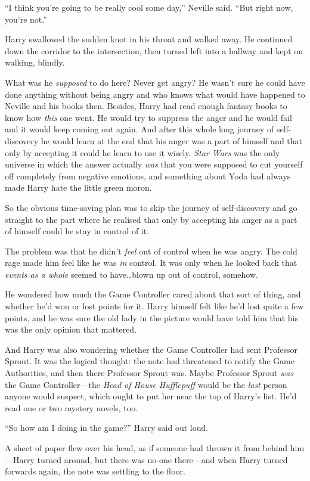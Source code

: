 “I think you’re going to be really cool some day,” Neville said. “But right now, you’re not.”

Harry swallowed the sudden knot in his throat and walked away. He continued down the corridor to the intersection, then turned left into a hallway and kept on walking, blindly.

What was he \emph{supposed} to do here? Never get angry? He wasn’t sure he could have done anything without being angry and who knows what would have happened to Neville and his books then. Besides, Harry had read enough fantasy books to know how \emph{this} one went. He would try to suppress the anger and he would fail and it would keep coming out again. And after this whole long journey of self-discovery he would learn at the end that his anger was a part of himself and that only by accepting it could he learn to use it wisely. \emph{Star Wars} was the only universe in which the answer actually \emph{was} that you were supposed to cut yourself off completely from negative emotions, and something about Yoda had always made Harry hate the little green moron.

So the obvious time-saving plan was to skip the journey of self-discovery and go straight to the part where he realised that only by accepting his anger as a part of himself could he stay in control of it.

The problem was that he didn’t \emph{feel} out of control when he was angry. The cold rage made him feel like he was \emph{in} control. It was only when he looked back that \emph{events as a whole} seemed to have…blown up out of control, somehow.

He wondered how much the Game Controller cared about that sort of thing, and whether he’d won or lost points for it. Harry himself felt like he’d lost quite a few points, and he was sure the old lady in the picture would have told him that his was the only opinion that mattered.

And Harry was also wondering whether the Game Controller had sent Professor Sprout. It was the logical thought: the note had threatened to notify the Game Authorities, and then there Professor Sprout was. Maybe Professor Sprout \emph{was} the Game Controller—the \emph{Head of House Hufflepuff} would be the \emph{last} person anyone would suspect, which ought to put her near the top of Harry’s list. He’d read one or two mystery novels, too.

“So how am I doing in the game?” Harry said out loud.

A sheet of paper flew over his head, as if someone had thrown it from behind him—Harry turned around, but there was no-one there—and when Harry turned forwards again, the note was settling to the floor.

